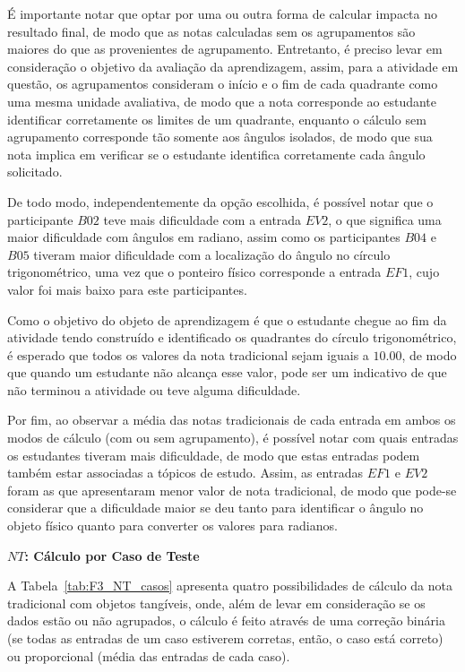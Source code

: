 É importante notar que optar por uma ou outra forma de calcular impacta no resultado final, de modo que as notas calculadas sem os agrupamentos são maiores do que as provenientes de agrupamento. Entretanto, é preciso levar em consideração o objetivo da avaliação da aprendizagem, assim, para a atividade em questão, os agrupamentos consideram o início e o fim de cada quadrante como uma mesma unidade avaliativa, de modo que a nota corresponde ao estudante identificar corretamente os limites de um quadrante, enquanto o cálculo sem agrupamento corresponde tão somente aos ângulos isolados, de modo que sua nota implica em verificar se o estudante identifica corretamente cada ângulo solicitado.

De todo modo, independentemente da opção escolhida, é possível notar que o participante $B02$ teve mais dificuldade com a entrada $EV2$, o que significa uma maior dificuldade com ângulos em radiano, assim como os participantes $B04$ e $B05$ tiveram maior dificuldade com a localização do ângulo no círculo trigonométrico, uma vez que o ponteiro físico corresponde a entrada $EF1$, cujo valor foi mais baixo para este participantes. 

Como o objetivo do objeto de aprendizagem é que o estudante chegue ao fim da atividade tendo construído e identificado os quadrantes do círculo trigonométrico, é esperado que todos os valores da nota tradicional sejam iguais a $10.00$, de modo que quando um estudante não alcança esse valor, pode ser um indicativo de que não terminou a atividade ou teve alguma dificuldade. 

Por fim, ao observar a média das notas tradicionais de cada entrada em ambos os modos de cálculo (com ou sem agrupamento), é possível notar com quais entradas os estudantes tiveram mais dificuldade, de modo que estas entradas podem também estar associadas a tópicos de estudo. Assim, as entradas $EF1$ e $EV2$ foram as que apresentaram menor valor de nota tradicional, de modo que pode-se considerar que a dificuldade maior se deu tanto para identificar o ângulo no objeto físico quanto para converter os valores para radianos.

\textbf{$NT$: Cálculo por Caso de Teste}

A Tabela~\ref{tab:F3_NT_casos} apresenta quatro possibilidades de cálculo da nota tradicional com objetos tangíveis, onde, além de levar em consideração se os dados estão ou não agrupados, o cálculo é feito através de uma correção binária (se todas as entradas de um caso estiverem corretas, então, o caso está correto) ou proporcional (média das entradas de cada caso).


